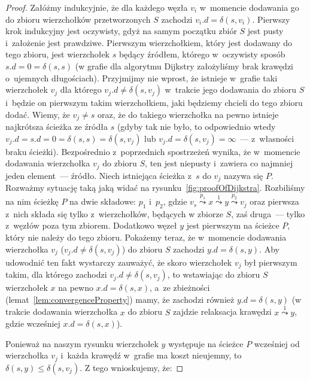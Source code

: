 \begin{proof}
\label{pr:dijkstra}
	Załóżmy indukcyjnie, że dla każdego węzła $v_{i}$ w~momencie dodawania go do zbioru wierzchołków przetworzonych $S$ zachodzi $v_{i}.d = \delta \left( s, v_{i} \right)$.
	Pierwszy krok indukcyjny jest oczywisty, gdyż na samym początku zbiór $S$ jest pusty i~założenie jest prawdziwe.
	Pierwszym wierzchołkiem, który jest dodawany do tego zbioru, jest wierzchołek $s$ będący źródłem, którego w~oczywisty sposób $s.d = 0 = \delta \left( s, s \right)$ (w grafie dla algorytmu Dijkstry założyliśmy brak krawędzi o~ujemnych długościach).
	Przyjmijmy nie wprost, że istnieje w~grafie taki wierzchołek $v_{j}$ dla którego $v_{j}.d \neq \delta \left( s, v_{j} \right)$ w~trakcie jego dodawania do zbioru $S$ i~będzie on pierwszym takim wierzchołkiem, jaki będziemy chcieli do tego zbioru dodać.
	Wiemy, że $v_{j} \neq s$ oraz, że do takiego wierzchołka na pewno istnieje najkrótsza ścieżka ze źródła $s$ (gdyby tak nie było, to odpowiednio wtedy $v_{j}.d = s.d = 0 = \delta \left( s, s \right) = \delta \left( s, v_{j} \right)$ lub $v_{j}.d = \delta \left( s, v_{j} \right) = \infty$~--- z~własności braku ścieżki).
	Bezpośrednio z~poprzednich spostrzeżeń wynika, że w~momencie dodawania wierzchołka $v_{j}$ do zbioru $S$, ten jest niepusty i~zawiera co najmniej jeden element~--- źródło.
	Niech istniejąca ścieżka z~$s$ do $v_{j}$ nazywa się $P$.
	Rozważmy sytuację taką jaką widać na rysunku~\ref{fig:proofOfDijkstra}.
	Rozbiliśmy na nim ścieżkę $P$ na dwie składowe: $p_{1}$ i~$p_{2}$, gdzie $v_{s} \overset{p_{1}}\leadsto x \overset{1}\leadsto y \overset{p_{2}}\leadsto v_{j}$ oraz pierwsza z~nich składa się tylko z~wierzchołków, będących w zbiorze $S$, zaś druga~--- tylko z~węzłów poza tym zbiorem.
	Dodatkowo węzeł $y$ jest pierwszym na ścieżce $P$, który nie należy do tego zbioru.
	Pokażemy teraz, że w~momencie dodawania wierzchołka $v_{j}$ ($v_{j}.d \neq \delta \left( s, v_{j} \right)$) do zbioru $S$ zachodzi $y.d = \delta \left( s, y \right)$.
	Aby udowodnić ten fakt wystarczy zauważyć, że skoro wierzchołek $v_{j}$ był pierwszym takim, dla którego zachodzi $v_{j}.d \neq \delta \left( s, v_{j} \right)$, to wstawiając do zbioru $S$ wierzchołek $x$ na pewno $x.d = \delta \left( s, x \right)$, a~ze zbieżności (lemat~\ref{lem:convergenceProperty}) mamy, że zachodzi również $y.d = \delta \left( s, y \right)$ (w trakcie dodawania wierzchołka $x$ do zbioru $S$ zajdzie relaksacja krawędzi $x \overset{1}\leadsto y$, gdzie wcześniej $x.d = \delta \left( s, x \right)$).
	
	Ponieważ na naszym rysunku wierzchołek $y$ występuje na ścieżce $P$ wcześniej od wierzchołka $v_{j}$ i~każda krawędź w~grafie ma koszt nieujemny, to $\delta \left( s, y \right) \leqslant \delta \left( s, v_{j} \right)$.
	Z tego wnioskujemy, że:
	

\end{proof}
